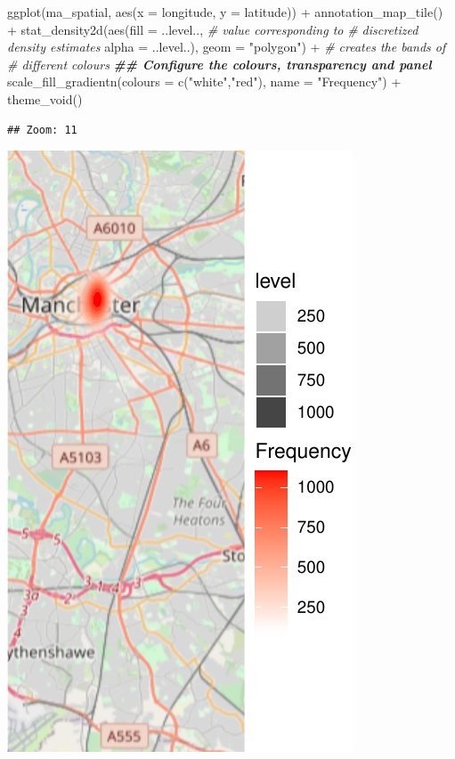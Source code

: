 \documentclass[
]{book}
\makeatletter
\newenvironment{Shaded}{\begin{snugshade}}{\end{snugshade}}
\newcommand{\AttributeTok}[1]{\textcolor[rgb]{0.61,0.61,0.61}{#1}}
\newcommand{\CommentTok}[1]{\textcolor[rgb]{0.37,0.37,0.37}{\textit{#1}}}
\newcommand{\DocumentationTok}[1]{\textcolor[rgb]{0.37,0.37,0.37}{\textbf{\textit{#1}}}}
\newcommand{\FunctionTok}[1]{\textcolor[rgb]{0,0,0}{#1}}
\newcommand{\NormalTok}[1]{#1}
\newcommand{\SpecialCharTok}[1]{\textcolor[rgb]{0,0,0}{#1}}
\newcommand{\StringTok}[1]{\textcolor[rgb]{0.5,0.5,0.5}{#1}}
\newenvironment{kframe}{%
\medskip{}
\setlength{\fboxsep}{.8em}
 \def\at@end@of@kframe{}%
 \ifinner\ifhmode%
  \def\at@end@of@kframe{\end{minipage}}%
  \begin{minipage}{\columnwidth}%
 \fi\fi%
 \def\FrameCommand##1{\hskip\@totalleftmargin \hskip-\fboxsep
 \colorbox{shadecolor}{##1}\hskip-\fboxsep
     \hskip-\linewidth \hskip-\@totalleftmargin \hskip\columnwidth}%
 \MakeFramed {\advance\hsize-\width
   \@totalleftmargin\z@ \linewidth\hsize
   \@setminipage}}%
 {\par\unskip\endMakeFramed%
 \at@end@of@kframe}
\renewenvironment{Shaded}{\begin{kframe}}{\end{kframe}}
\makeatother
\begin{document}
\begin{Shaded}
\begin{Highlighting}[]
\FunctionTok{ggplot}\NormalTok{(ma\_spatial, }\FunctionTok{aes}\NormalTok{(}\AttributeTok{x =}\NormalTok{ longitude, }\AttributeTok{y =}\NormalTok{ latitude)) }\SpecialCharTok{+} 
  \FunctionTok{annotation\_map\_tile}\NormalTok{() }\SpecialCharTok{+} 
  \FunctionTok{stat\_density2d}\NormalTok{(}\FunctionTok{aes}\NormalTok{(}\AttributeTok{fill =}\NormalTok{ ..level.., }\CommentTok{\# value corresponding to }
                                       \CommentTok{\# discretized density estimates }
                     \AttributeTok{alpha =}\NormalTok{ ..level..), }
                 \AttributeTok{geom =} \StringTok{"polygon"}\NormalTok{) }\SpecialCharTok{+}  \CommentTok{\# creates the bands of }
                                      \CommentTok{\# different colours}
  \DocumentationTok{\#\# Configure the colours, transparency and panel}
  \FunctionTok{scale\_fill\_gradientn}\NormalTok{(}\AttributeTok{colours =} \FunctionTok{c}\NormalTok{(}\StringTok{"white"}\NormalTok{,}\StringTok{"red"}\NormalTok{), }
                       \AttributeTok{name =} \StringTok{"Frequency"}\NormalTok{) }\SpecialCharTok{+} 
  \FunctionTok{theme\_void}\NormalTok{()}
\end{Highlighting}
\end{Shaded}

\begin{verbatim}
## Zoom: 11
\end{verbatim}

\includegraphics{crime_mapping_files/figure-latex/unnamed-chunk-130-1.pdf}
\end{document}
